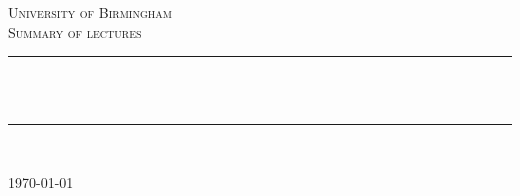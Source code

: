 \newcommand{\HRule}{\rule{\linewidth}{0.5mm}}

\begin{titlepage}
\begin{center}


\textsc{\LARGE University of Birmingham}\\[1.5cm]

\textsc{\Large Summary of lectures}\\[0.5cm]


\HRule \\[0.4cm]
{ \huge \bfseries \nameOfTheModule}\\[0.4cm]
\HRule \\[1.5cm]

\nameOfTheAuthor

\vfill

{\large \today}

\end{center}
\end{titlepage}